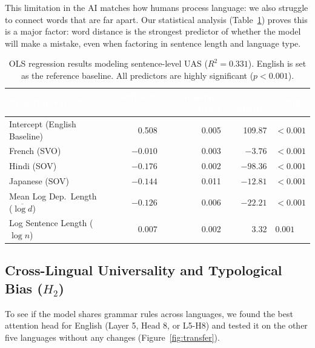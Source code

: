 \documentclass[11pt, a4paper]{article}
\begin{document}
This limitation in the AI matches how humans process language: we also struggle to connect words that are far apart. Our statistical analysis (Table~\ref{tab:ols}) proves this is a major factor: word distance is the strongest predictor of whether the model will make a mistake, even when factoring in sentence length and language type.

\begin{table}[H]
\vspace{-8pt}
\centering
\caption{OLS regression results modeling sentence-level UAS ($R^2{=}0.331$). English is set as the reference baseline. All predictors are highly significant ($p < 0.001$).}
\label{tab:ols}
\scriptsize
\setlength{\tabcolsep}{3pt}
\begin{tabular}{l r r r l}
\toprule
\rowcolor{headerbg}
\textcolor{white}{Predictor Variable} & \textcolor{white}{Coefficient $\beta$} & \textcolor{white}{Standard Error} & \textcolor{white}{$t$-statistic} & \textcolor{white}{$p$-value} \\
\midrule
\rowcolor{rowalt}
Intercept (English Baseline)   &  0.508  & 0.005 & 109.87 & $<0.001$ \\
French (SVO)                   & $-0.010$ & 0.003 & $-3.76$  & $<0.001$ \\
\rowcolor{rowalt}
Hindi (SOV)                    & $-0.176$ & 0.002 & $-98.36$ & $<0.001$ \\
Japanese (SOV)                 & $-0.144$ & 0.011 & $-12.81$ & $<0.001$ \\
\rowcolor{rowalt}
Mean Log Dep.\ Length ($\overline{\log d}$) & $-0.126$ & 0.006 & $-22.21$ & $<0.001$ \\
Log Sentence Length ($\log n$) &  0.007  & 0.002 &   3.32  & $0.001$  \\
\bottomrule
\end{tabular}
\vspace{-10pt}
\end{table}

\subsection{Cross-Lingual Universality and Typological Bias ($H_2$)}

To see if the model shares grammar rules across languages, we found the best attention head for English (Layer 5, Head 8, or L5-H8) and tested it on the other five languages without any changes (Figure~\ref{fig:transfer}).
\end{document}
